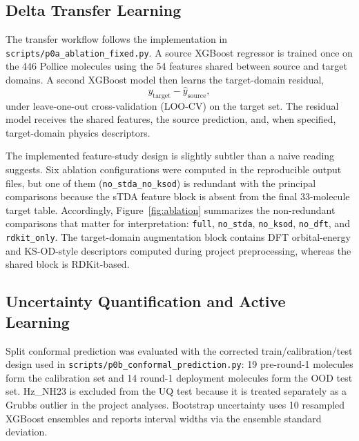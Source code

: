 \documentclass[journal=jcisd8,manuscript=article]{achemso}
\begin{document}
\subsection{Delta Transfer Learning}

The transfer workflow follows the implementation in \texttt{scripts/p0a\_ablation\_fixed.py}. A source XGBoost regressor\cite{Chen2016} is trained once on the 446 Pollice molecules using the 54 features shared between source and target domains. A second XGBoost model then learns the target-domain residual,
\begin{equation}
  y_\mathrm{target}-\hat{y}_\mathrm{source},
\end{equation}
under leave-one-out cross-validation (LOO-CV) on the target set. The residual model receives the shared features, the source prediction, and, when specified, target-domain physics descriptors.

The implemented feature-study design is slightly subtler than a naive reading suggests. Six ablation configurations were computed in the reproducible output files, but one of them (\texttt{no\_stda\_no\_ksod}) is redundant with the principal comparisons because the sTDA feature block is absent from the final 33-molecule target table. Accordingly, Figure~\ref{fig:ablation} summarizes the non-redundant comparisons that matter for interpretation: \texttt{full}, \texttt{no\_stda}, \texttt{no\_ksod}, \texttt{no\_dft}, and \texttt{rdkit\_only}. The target-domain augmentation block contains DFT orbital-energy and KS-OD-style descriptors computed during project preprocessing, whereas the shared block is RDKit-based.

\subsection{Uncertainty Quantification and Active Learning}

Split conformal prediction\cite{Vovk2005} was evaluated with the corrected train/calibration/test design used in \texttt{scripts/p0b\_conformal\_prediction.py}: 19 pre-round-1 molecules form the calibration set and 14 round-1 deployment molecules form the OOD test set. Hz\_NH23 is excluded from the UQ test because it is treated separately as a Grubbs outlier in the project analyses. Bootstrap uncertainty uses 10 resampled XGBoost ensembles and reports interval widths via the ensemble standard deviation.
\end{document}
